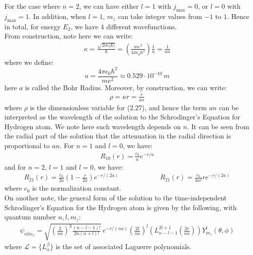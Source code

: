 \documentclass[11pt]{book}
\theoremstyle{break}
\theoremstyle{break}
\begin{document}
For the case where $n=2$, we can have either $l=1$ with $j_{\max} = 0$, or $l=0$ with $j_{\max} = 1$. In addition, when $l=1$, $m_z$ can take integer values from $-1$ to $1$. Hence in total, for energy $E_2$, we have $4$ different wavefunctions. \\

From construction, note here we can write:
\begin{align*}
\kappa = \frac{\sqrt{2m|E|}}{\hbar} = \left( \frac{me^2}{4\pi \epsilon_0 \hbar^2}\right) \frac{1}{n} = \frac{1}{an}
\end{align*}
where we define: 
$$a = \frac{4\pi \epsilon_0 \hbar^2}{me^2} \approx 0.529 \cdot 10^{-10}\, m$$
here $a$ is called the Bohr Radius. Moreover, by construction, we can write:
\begin{align*}
\rho = \kappa r = \frac{r}{an}
\end{align*}
where $\rho$ is the dimensionless variable for (2.27), and hence the term $an$ can be interpreted as the wavelength of the solution to the Schrodinger's Equation for Hydrogen atom. We note here such wavelength depends on $n$. It can be seen from the radial part of the solution that the attenuation in the radial direction is proportional to $an$. For $n=1$ and $l=0$, we have:
\begin{align*}
R_{10}(r)  = \frac{c_0}{a}e^{-r/a}
\end{align*}
and for $n=2$, $l=1$ and $l=0$, we have:
\begin{align*}
R_{21}(r) = \frac{c_0}{2a}\left( 1 - \frac{r}{2a}\right) e^{-r/(2a)} \qquad\qquad\qquad R_{21}(r) =\frac{c_0}{4a^2}re^{-r/(2a)}
\end{align*}
where $c_0$ is the normalization constant.\\

On another note, the general form of the solution to the time-independent Schrodinger's Equation for the Hydrogen atom is given by the following, with quantum number $n,l,m_z$:
\begin{align*}
\psi_{nlm_z} = \sqrt{\left(\frac{2}{na} \right)^3 \frac{(n-l-1)!}{2n(n+l)!}}\, e^{-r/(na)}\left( \frac{2l}{na}\right)^l \left( L_{n-l-1}^{2l+1}\left( \frac{2r}{na}\right) \right) Y_{m_z}^l (\theta,\phi)
\end{align*}
where $\mathcal{L} = \{L_{\alpha}^\beta\}$ is the set of associated Laguerre polynomials.
\end{document}

